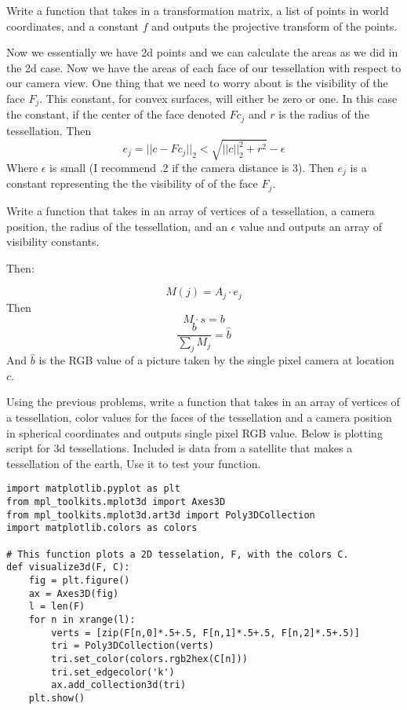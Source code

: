 \begin{problem}
Write a function that takes in a transformation matrix, a list of points in world coordinates, and a constant $f$ and outputs the projective transform of the points.
\end{problem}

Now we essentially we have 2d points and we can calculate the areas as we did in the 2d case. Now we have the areas of each face of our tessellation with respect to our camera view. One thing that we need to worry about is the visibility of the face $F_j$. This constant, for convex surfaces, will either be zero or one. In this case the constant, if the center of the face denoted $Fc_j$ and $r$ is the radius of the tessellation. Then
\[
e_j=||c-Fc_j||_2<\sqrt{||c||_2^2+r^2}-\epsilon
\] 
Where $\epsilon$ is small (I recommend .2 if the camera distance is 3).
Then $e_j$ is a constant representing the  the visibility of of the face $F_j$.

\begin{problem}
Write a function that takes in an array of vertices of a tessellation, a camera position, the radius of the tessellation, and an $\epsilon$ value and outputs an array of visibility constants.
\end{problem}
Then:

\begin{equation}
M(j) = A_j \cdot e_j
\end{equation}
Then
\begin{equation}
M \cdot s = b
\end{equation}
\begin{equation}
\frac{b}{\sum_j M_j} = \hat{b}
\end{equation}
And $\hat{b}$ is the RGB value of a picture taken by the single pixel camera at location $c$.

\begin{problem}
Using the previous problems, write a function that takes in an array of vertices of a tessellation, color values for the faces of the tessellation and a camera position in spherical coordinates and outputs single pixel RGB value. 
Below is plotting script for 3d tessellations. 
Included is data from a satellite that makes a tessellation of the earth, Use it to test your function.
\begin{lstlisting}
import matplotlib.pyplot as plt
from mpl_toolkits.mplot3d import Axes3D
from mpl_toolkits.mplot3d.art3d import Poly3DCollection
import matplotlib.colors as colors

# This function plots a 2D tesselation, F, with the colors C. 
def visualize3d(F, C):
    fig = plt.figure()
    ax = Axes3D(fig)
    l = len(F)
    for n in xrange(l):
        verts = [zip(F[n,0]*.5+.5, F[n,1]*.5+.5, F[n,2]*.5+.5)]
        tri = Poly3DCollection(verts)
        tri.set_color(colors.rgb2hex(C[n]))
        tri.set_edgecolor('k')
        ax.add_collection3d(tri)
    plt.show()
\end{lstlisting}
\end{problem}

